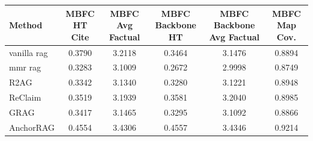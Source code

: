 \begin{tabular}{lccccc}
\toprule
Method & MBFC HT Cite & MBFC Avg Factual & MBFC Backbone HT & MBFC Backbone Avg Factual & MBFC Map Cov. \\
\midrule
vanilla rag & 0.3790 & 3.2118 & 0.3464 & 3.1476 & 0.8894 \\
mmr rag & 0.3283 & 3.1009 & 0.2672 & 2.9998 & 0.8749 \\
R2AG & 0.3342 & 3.1340 & 0.3280 & 3.1221 & 0.8948 \\
ReClaim & 0.3519 & 3.1939 & 0.3581 & 3.2040 & 0.8985 \\
GRAG & 0.3417 & 3.1465 & 0.3295 & 3.1092 & 0.8866 \\
AnchorRAG & 0.4554 & 3.4306 & 0.4557 & 3.4346 & 0.9214 \\
\bottomrule
\end{tabular}
